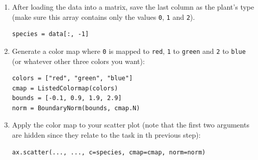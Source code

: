 \documentclass[12pt]{scrartcl}
\newcommand{\pyinl}[1]{\texttt{#1}}
\begin{document}
\begin{enumerate}
\begin{enumerate}
        \item After loading the data into a matrix, save the last column as the plant's type (make sure this array contains only the values \pyinl{0}, \pyinl{1} and \pyinl{2}).
            \begin{verbatim}
species = data[:, -1]
            \end{verbatim}

        \item Generate a color map where \pyinl{0} is mapped to \pyinl{red}, \pyinl{1} to \pyinl{green} and \pyinl{2} to \pyinl{blue} (or whatever other three colors you want):
            \begin{verbatim}
colors = ["red", "green", "blue"]
cmap = ListedColormap(colors)
bounds = [-0.1, 0.9, 1.9, 2.9]
norm = BoundaryNorm(bounds, cmap.N)
            \end{verbatim}

        \item Apply the color map to your scatter plot (note that the first two arguments are hidden since they relate to the task in th previous step):
            \begin{verbatim}
ax.scatter(..., ..., c=species, cmap=cmap, norm=norm)
            \end{verbatim}
    \end{enumerate}

\end{enumerate}
\end{document}
